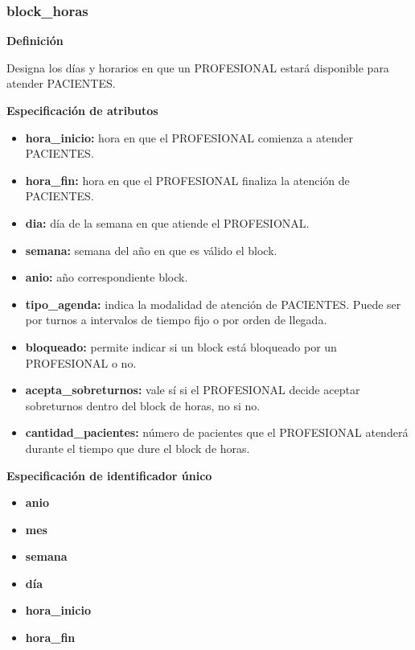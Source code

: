 \documentclass[a4paper,11pt]{article}
\begin{document}
\subsubsection{\textbf{block\_horas}}

\textbf{Definición}

Designa los días y horarios en que un PROFESIONAL estará disponible para atender 
PACIENTES.

\textbf{Especificación de atributos}

\begin{itemize}


     \item \textbf{hora\_inicio:} hora en que el PROFESIONAL comienza a atender PACIENTES.

     \item \textbf{hora\_fin:} hora en que el PROFESIONAL finaliza la atención de PACIENTES.

     \item \textbf{dia:} día de la semana en que atiende el PROFESIONAL.

     \item \textbf{semana:} semana del año en que es válido el block.

	 \item \textbf{anio:} año correspondiente block.
	 
     \item \textbf{tipo\_agenda:} indica la modalidad de atención de PACIENTES. Puede ser por 
     turnos a intervalos de tiempo fijo o por orden de llegada.

     \item \textbf{bloqueado:} permite indicar si un block está bloqueado por un PROFESIONAL o no.

     \item \textbf{acepta\_sobreturnos:} vale sí si el PROFESIONAL decide aceptar sobreturnos dentro 
     del block de horas, no si no.

     \item \textbf{cantidad\_pacientes:} número de pacientes que el PROFESIONAL atenderá durante el tiempo que dure el block de horas.

\end{itemize}

\textbf{Especificación de identificador único}

\begin{itemize}
	\item \textbf{anio}
	\item \textbf{mes}
	\item \textbf{semana}
	\item \textbf{día}
	\item \textbf{hora\_inicio}
	\item \textbf{hora\_fin}
   

\end{itemize}
\end{document}
